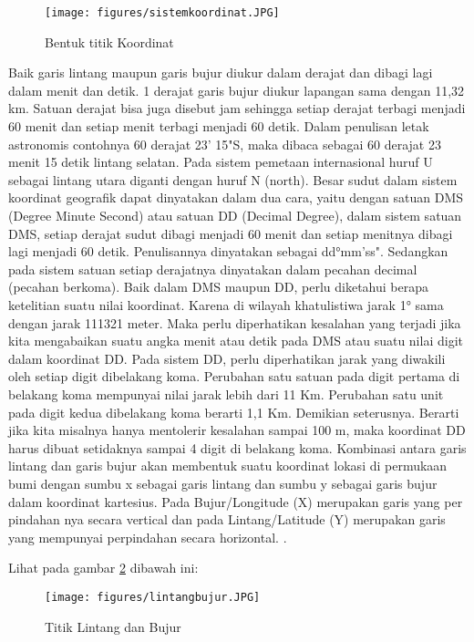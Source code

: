 \begin{figure}[ht]
	\centerline{\texttt{[image: figures/sistemkoordinat.JPG]}}
	\caption{Bentuk titik Koordinat}
	\label{sistem koordinat}
	\end{figure}


Baik garis lintang maupun garis bujur diukur dalam derajat dan dibagi lagi dalam menit dan detik. 1 derajat garis bujur diukur lapangan sama dengan 11,32 km. Satuan derajat bisa juga disebut jam sehingga setiap derajat terbagi menjadi 60 menit dan setiap menit terbagi menjadi 60 detik. Dalam penulisan letak astronomis contohnya 60 derajat 23' 15"S, maka dibaca sebagai 60 derajat 23 menit 15 detik lintang selatan. Pada sistem pemetaan internasional huruf U sebagai lintang utara diganti dengan huruf N (north). Besar sudut dalam sistem koordinat geografik dapat dinyatakan dalam dua cara, yaitu dengan satuan DMS (Degree Minute Second) atau satuan DD (Decimal Degree), dalam sistem satuan DMS, setiap derajat sudut dibagi menjadi 60 menit dan setiap menitnya dibagi lagi menjadi 60 detik. Penulisannya dinyatakan sebagai dd°mm'ss". Sedangkan pada sistem satuan setiap derajatnya dinyatakan dalam pecahan decimal (pecahan berkoma). Baik dalam DMS maupun DD, perlu diketahui berapa ketelitian suatu nilai koordinat. Karena di wilayah khatulistiwa jarak 1° sama dengan jarak 111321 meter. Maka perlu diperhatikan kesalahan yang terjadi jika kita mengabaikan suatu angka menit atau detik pada DMS atau suatu nilai digit dalam koordinat DD. Pada sistem DD, perlu diperhatikan jarak yang diwakili oleh setiap digit dibelakang koma. Perubahan satu satuan pada digit pertama di belakang koma mempunyai nilai jarak lebih dari 11 Km. Perubahan satu unit pada digit kedua dibelakang koma berarti 1,1 Km. Demikian seterusnya. Berarti jika kita misalnya hanya mentolerir kesalahan sampai 100 m, maka koordinat DD harus dibuat setidaknya sampai 4 digit di belakang koma. Kombinasi antara garis lintang dan garis bujur akan membentuk suatu koordinat lokasi di permukaan bumi dengan sumbu x sebagai garis lintang dan sumbu y sebagai garis bujur dalam koordinat kartesius. Pada Bujur/Longitude (X) merupakan garis yang per pindahan nya secara vertical dan pada Lintang/Latitude (Y) merupakan garis yang mempunyai perpindahan secara horizontal. \cite{zuhdi2012sistem}.

Lihat pada gambar \ref{lintang bujur} dibawah ini:

\begin{figure}[ht]
	\centerline{\texttt{[image: figures/lintangbujur.JPG]}}
	\caption{Titik Lintang dan Bujur}
	\label{lintang bujur}
	\end{figure}

